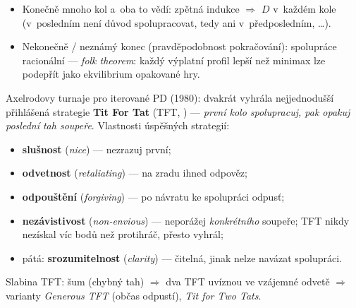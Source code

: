 \documentclass[11pt,a4paper]{article}
\theoremstyle{definition}
\begin{document}
\begin{defbox}
\begin{itemize}
\item Konečně mnoho kol a~oba to vědí: zpětná indukce $\Rightarrow$ $D$ v~každém kole
  (v~posledním není důvod spolupracovat, tedy ani v~předposledním, \dots).
\item Nekonečně / neznámý konec (pravděpodobnost pokračování): spolupráce racionální ---
  \emph{folk theorem}: každý výplatní profil lepší než minimax lze podepřít jako ekvilibrium
  opakované hry.
\end{itemize}
Axelrodovy turnaje pro iterované PD (1980): dvakrát vyhrála nejjednodušší přihlášená strategie
\textbf{Tit For Tat} (TFT, ) --- \emph{první kolo spolupracuj, pak opakuj
poslední tah soupeře}. Vlastnosti úspěšných strategií:
\begin{itemize}
\item \textbf{slušnost} (\emph{nice}) --- nezrazuj první;
\item \textbf{odvetnost} (\emph{retaliating}) --- na zradu ihned odpověz;
\item \textbf{odpouštění} (\emph{forgiving}) --- po návratu ke spolupráci odpusť;
\item \textbf{nezávistivost} (\emph{non-envious}) --- neporážej \emph{konkrétního} soupeře;
  TFT nikdy nezískal víc bodů než protihráč, přesto vyhrál;
\item pátá: \textbf{srozumitelnost} (\emph{clarity}) --- čitelná, jinak nelze navázat
  spolupráci.
\end{itemize}
Slabina TFT: šum (chybný tah) $\Rightarrow$ dva TFT uvíznou ve vzájemné odvetě $\Rightarrow$
varianty \emph{Generous TFT} (občas odpustí), \emph{Tit for Two Tats}.
\end{defbox}
\end{document}
